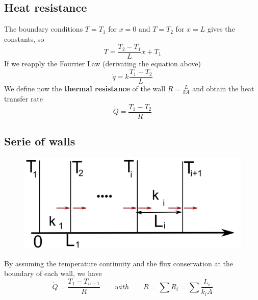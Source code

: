  			\subsection{Heat resistance}
	 			The boundary conditions $T =T_1$ for $x = 0$ and $T=T_2$ for $x=L$ gives the constants, so
 				\begin{equation}
 					T = \frac{T_2-T_1}{L}x + T_1
 				\end{equation}
 				If we reapply the Fourrier Law (derivating the equation above) 
 				\begin{equation}
	 				\dot{q} = k\frac{T_1 -T_2}{L}
 				\end{equation}
 				We define now the \textbf{thermal resistance} of the wall $R = \frac{L}{kA}$ and obtain the heat transfer rate 
 				\begin{equation}
 					\dot{Q} = \frac{T_1 - T_2}{R}
 				\end{equation}
 				
 			\subsection{Serie of walls}
 				\begin{figure}
 				\vspace{-5mm}
 				\includegraphics[scale=0.2]{ch3/6}
 				\end{figure}
 				By assuming the temperature continuity and the flux conservation at the boundary of each wall, we have 
 				\begin{equation}
 					\dot{Q} = \frac{T_1-T_{n+1}}{R} \qquad with \qquad R =\sum R_i = \sum \frac{L_i}{k_iA}
 				\end{equation}
 				
